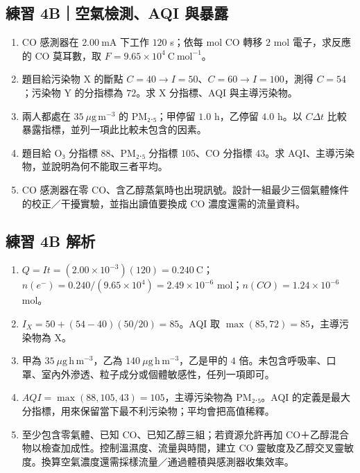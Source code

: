\documentclass[11pt,a4paper]{article}
\providecommand{\tightlist}{%
  \setlength{\itemsep}{0pt}\setlength{\parskip}{0pt}}
\begin{document}
\subsection{練習 4B｜空氣檢測、AQI 與暴露}\label{ux7df4ux7fd2-4bux7a7aux6c23ux6aa2ux6e2caqi-ux8207ux66b4ux9732}

\begin{enumerate}
\def\labelenumi{\arabic{enumi}.}
\tightlist
\item
  CO 感測器在 \(2.00\ \mathrm{mA}\) 下工作 \(120\) s；依每 mol CO 轉移 \(2\) mol 電子，求反應的 CO 莫耳數，取 \(F=9.65\times10^4\ \mathrm{C\ mol^{-1}}\)。
\item
  題目給污染物 X 的斷點 \(C=40\to I=50\)、\(C=60\to I=100\)，測得 \(C=54\)；污染物 Y 的分指標為 \(72\)。求 X 分指標、AQI 與主導污染物。
\item
  兩人都處在 \(35\ \mu\mathrm{g\,m^{-3}}\) 的 PM₂.₅；甲停留 \(1.0\) h，乙停留 \(4.0\) h。以 \(C\Delta t\) 比較暴露指標，並列一項此比較未包含的因素。
\item
  題目給 O₃ 分指標 \(88\)、PM₂.₅ 分指標 \(105\)、CO 分指標 \(43\)。求 AQI、主導污染物，並說明為何不能取三者平均。
\item
  CO 感測器在零 CO、含乙醇蒸氣時也出現訊號。設計一組最少三個氣體條件的校正／干擾實驗，並指出讀值要換成 CO 濃度還需的流量資料。
\end{enumerate}

\subsection{練習 4B 解析}\label{ux7df4ux7fd2-4b-ux89e3ux6790}

\begin{enumerate}
\def\labelenumi{\arabic{enumi}.}
\tightlist
\item
  \(Q=It=(2.00\times10^{-3})(120)=0.240\ \mathrm C\)；\(n(e^-)=0.240/(9.65\times10^4)=2.49\times10^{-6}\) mol；\(n(CO)=1.24\times10^{-6}\) mol。
\item
  \(I_X=50+(54-40)(50/20)=85\)。AQI 取 \(\max(85,72)=85\)，主導污染物為 X。
\item
  甲為 \(35\ \mu\mathrm{g\,h\,m^{-3}}\)，乙為 \(140\ \mu\mathrm{g\,h\,m^{-3}}\)，乙是甲的 \(4\) 倍。未包含呼吸率、口罩、室內外滲透、粒子成分或個體敏感性，任列一項即可。
\item
  \(AQI=\max(88,105,43)=105\)，主導污染物為 PM₂.₅。AQI 的定義是最大分指標，用來保留當下最不利污染物；平均會把高值稀釋。
\item
  至少包含零氣體、已知 CO、已知乙醇三組；若資源允許再加 CO＋乙醇混合物以檢查加成性。控制溫濕度、流量與時間，建立 CO 靈敏度及乙醇交叉靈敏度。換算空氣濃度還需採樣流量／通過體積與感測器收集效率。
\end{enumerate}
\end{document}
